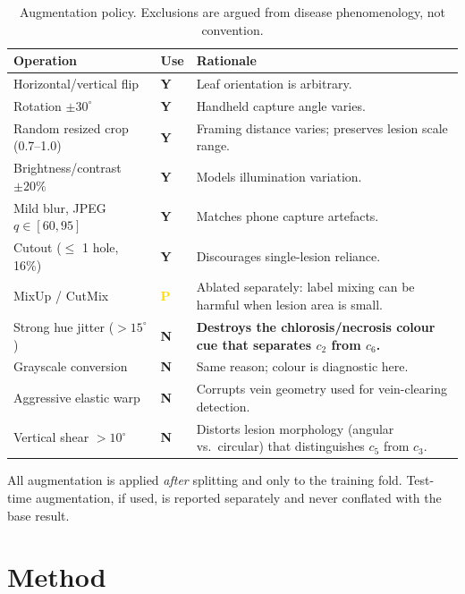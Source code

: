 \documentclass[10pt,twocolumn,a4paper]{article}
\newcommand{\cmark}{\textcolor{leafgreen}{\textbf{Y}}}
\newcommand{\xmark}{\textcolor{tbdred}{\textbf{N}}}
\newcommand{\pmark}{\textcolor{gold}{\textbf{P}}}
\begin{document}
\begin{table}[H]
\centering
\caption{Augmentation policy. Exclusions are argued from disease phenomenology, not convention.}
\label{tab:aug}
{\footnotesize
\begin{tabularx}{\columnwidth}{@{}p{2.15cm} p{0.55cm} X@{}}
\toprule
\rowcolor{hdrgray}
Operation & Use & Rationale \\
\midrule
Horizontal/vertical flip & \cmark & Leaf orientation is arbitrary. \\
Rotation $\pm 30^\circ$ & \cmark & Handheld capture angle varies. \\
Random resized crop (0.7--1.0) & \cmark & Framing distance varies; preserves lesion scale range. \\
Brightness/contrast $\pm 20\%$ & \cmark & Models illumination variation. \\
Mild blur, JPEG $q\!\in\![60,95]$ & \cmark & Matches phone capture artefacts. \\
Cutout ($\le$ 1 hole, 16\%) & \cmark & Discourages single-lesion reliance. \\
MixUp / CutMix & \pmark & Ablated separately: label mixing can be harmful when lesion area is small. \\
\midrule
Strong hue jitter ($>15^\circ$) & \xmark & \textbf{Destroys the chlorosis/necrosis colour cue that separates $c_2$ from $c_6$.} \\
Grayscale conversion & \xmark & Same reason; colour is diagnostic here. \\
Aggressive elastic warp & \xmark & Corrupts vein geometry used for vein-clearing detection. \\
Vertical shear $>10^\circ$ & \xmark & Distorts lesion morphology (angular vs.\ circular) that distinguishes $c_5$ from $c_3$. \\
\bottomrule
\end{tabularx}}
\vspace{2pt}
{\scriptsize All augmentation is applied \emph{after} splitting and only to the training fold. Test-time augmentation, if used, is reported separately and never conflated with the base result.}
\end{table}
\section{Method}
\label{sec:method}
\end{document}
